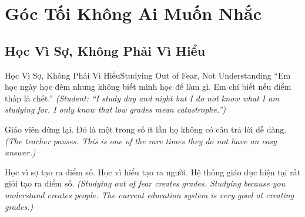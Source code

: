
\chapter{Góc Tối Không Ai Muốn Nhắc}

\section{Học Vì Sợ, Không Phải Vì Hiểu}
\begin{truyen}{Học Vì Sợ, Không Phải Vì Hiểu}{Studying Out of Fear, Not Understanding}
 ``Em học ngày học đêm nhưng không biết mình học để làm gì. Em chỉ biết nếu điểm thấp là chết.''
\textit{(Student: ``I study day and night but I do not know what I am studying for. I only know that low grades mean catastrophe.'')}



Giáo viên dừng lại. Đó là một trong số ít lần họ không có câu trả lời dễ dàng.
\textit{(The teacher pauses. This is one of the rare times they do not have an easy answer.)}

\begin{baihoc}
Học vì sợ tạo ra điểm số. Học vì hiểu tạo ra người. Hệ thống giáo dục hiện tại rất giỏi tạo ra điểm số.
\textit{(Studying out of fear creates grades. Studying because you understand creates people. The current education system is very good at creating grades.)}
\end{baihoc}
\end{truyen}

